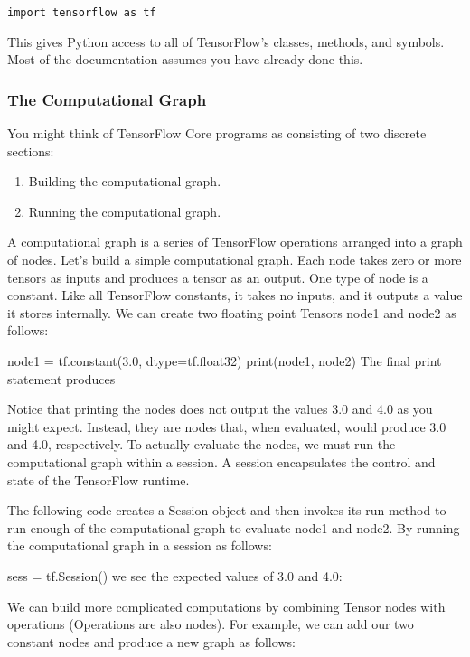 \documentclass[10pt,a4paper]{ctexbook}
\begin{document}
\begin{verbatim}
import tensorflow as tf
\end{verbatim}

This gives Python access to all of TensorFlow's classes, methods, and symbols. Most of the documentation assumes you have already done this.

\subsubsection{The Computational Graph}
You might think of TensorFlow Core programs as consisting of two discrete sections:

\begin{enumerate}
\item Building the computational graph.
\item Running the computational graph.
\end{enumerate}

A computational graph is a series of TensorFlow operations arranged into a graph of nodes. Let's build a simple computational graph. Each node takes zero or more tensors as inputs and produces a tensor as an output. One type of node is a constant. Like all TensorFlow constants, it takes no inputs, and it outputs a value it stores internally. We can create two floating point Tensors node1 and node2 as follows:

node1 = tf.constant(3.0, dtype=tf.float32)
print(node1, node2)
The final print statement produces

Notice that printing the nodes does not output the values 3.0 and 4.0 as you might expect. Instead, they are nodes that, when evaluated, would produce 3.0 and 4.0, respectively. To actually evaluate the nodes, we must run the computational graph within a session. A session encapsulates the control and state of the TensorFlow runtime.

The following code creates a Session object and then invokes its run method to run enough of the computational graph to evaluate node1 and node2. By running the computational graph in a session as follows:

sess = tf.Session()
we see the expected values of 3.0 and 4.0:

We can build more complicated computations by combining Tensor nodes with operations (Operations are also nodes). For example, we can add our two constant nodes and produce a new graph as follows:
\end{document}
